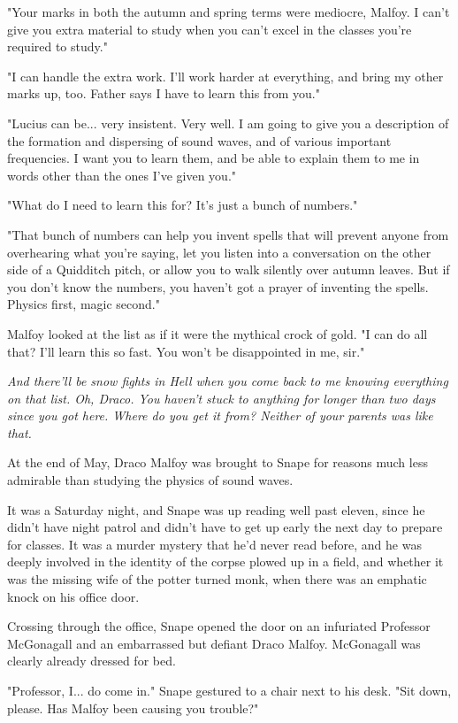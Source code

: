 "Your marks in both the autumn and spring terms were mediocre, Malfoy. I can't give you extra material to study when you can't excel in the classes you're required to study."

"I can handle the extra work. I'll work harder at everything, and bring my other marks up, too. Father says I have to learn this from you."

"Lucius can be... very insistent. Very well. I am going to give you a description of the formation and dispersing of sound waves, and of various important frequencies. I want you to learn them, and be able to explain them to me in words other than the ones I've given you."

"What do I need to learn this for? It's just a bunch of numbers."

"That bunch of numbers can help you invent spells that will prevent anyone from overhearing what you're saying, let you listen into a conversation on the other side of a Quidditch pitch, or allow you to walk silently over autumn leaves. But if you don't know the numbers, you haven't got a prayer of inventing the spells. Physics first, magic second."

Malfoy looked at the list as if it were the mythical crock of gold. "I can do all that? I'll learn this so fast. You won't be disappointed in me, sir."

\emph{And there'll be snow fights in Hell when you come back to me knowing everything on that list. Oh, Draco. You haven't stuck to anything for longer than two days since you got here. Where do you get it from? Neither of your parents was like that.}

At the end of May, Draco Malfoy was brought to Snape for reasons much less admirable than studying the physics of sound waves.

It was a Saturday night, and Snape was up reading well past eleven, since he didn't have night patrol and didn't have to get up early the next day to prepare for classes. It was a murder mystery that he'd never read before, and he was deeply involved in the identity of the corpse plowed up in a field, and whether it was the missing wife of the potter turned monk, when there was an emphatic knock on his office door.

Crossing through the office, Snape opened the door on an infuriated Professor McGonagall and an embarrassed but defiant Draco Malfoy. McGonagall was clearly already dressed for bed.

"Professor, I... do come in." Snape gestured to a chair next to his desk. "Sit down, please. Has Malfoy been causing you trouble?"

